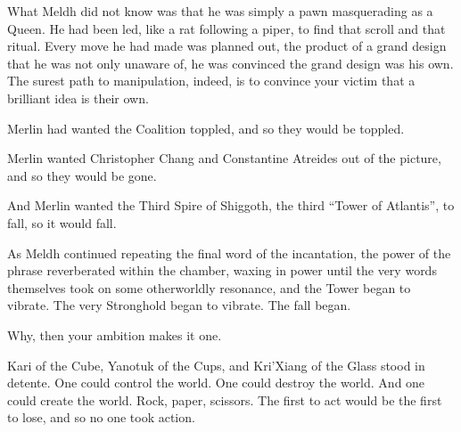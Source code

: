 What Meldh did not know was that he was simply a pawn masquerading as a Queen. He had been led, like a rat following a piper, to find that scroll and that ritual. Every move he had made was planned out, the product of a grand design that he was not only unaware of, he was convinced the grand design was his own. The surest path to manipulation, indeed, is to convince your victim that a brilliant idea is their own.

Merlin had wanted the Coalition toppled, and so they would be toppled.

Merlin wanted Christopher Chang and Constantine Atreides out of the picture, and so they would be gone.

And Merlin wanted the Third Spire of Shiggoth, the third “Tower of Atlantis”, to fall, so it would fall.

As Meldh continued repeating the final word of the incantation, the power of the phrase reverberated within the chamber, waxing in power until the very words themselves took on some otherworldly resonance, and the Tower began to vibrate. The very Stronghold began to vibrate.
\SmallVSpace
The fall began.

\simpleline

{Why, then your ambition makes it one.}
\simpleline	
\SmallVSpace
{}

Kari of the Cube, Yanotuk of the Cups, and Kri’Xiang of the Glass stood in detente. One could control the world. One could destroy the world. And one could create the world. Rock, paper, scissors. The first to act would be the first to lose, and so no one took action.
\SmallVSpace
{}

